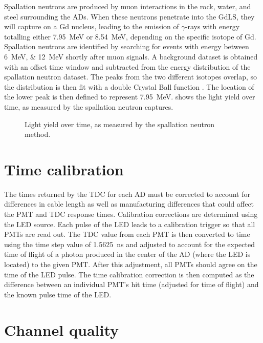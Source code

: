 Spallation neutrons are produced by muon interactions in the rock,
water, and steel surrounding the ADs.
When these neutrons penetrate into the GdLS,
they will capture on a Gd nucleus, leading to the emission of $\gamma$-rays
with energy totalling either \SI{7.95}{\MeV} or \SI{8.54}{\MeV},
depending on the specific isotope of Gd.
Spallation neutrons are identified by searching for events
with energy between \SIlist{6;12}{\MeV} shortly after muon signals.
A background dataset is obtained with an offset time window
and subtracted from the energy distribution of the spallation neutron dataset.
The peaks from the two different isotopes overlap,
so the distribution is then fit with a double Crystal Ball function \cite{cbfunction}.
The location of the lower peak is then defined to represent \SI{7.95}{\MeV}.
 shows the light yield over time,
as measured by the spallation neutron captures.

\begin{figure}
    \caption{Light yield over time, as measured by the spallation neutron method.}
    \label{fig:lightyield}
\end{figure}

\section{Time calibration}
\label{sec:time_calib}

The times returned by the TDC for each AD must be corrected
to account for differences in cable length as well as
manufacturing differences that could affect the PMT and TDC response times.
Calibration corrections are determined using the LED source.
Each pulse of the LED leads to a calibration trigger so that all PMTs are read out.
The TDC value from each PMT is then converted to time using the
time step value of \SI{1.5625}{\ns} and adjusted
to account for the expected time of flight
of a photon produced in the center of the AD (where the LED is located)
to the given PMT.
After this adjustment, all PMTs should agree on the time of the LED pulse.
The time calibration correction is then computed
as the difference between an individual PMT's hit time
(adjusted for time of flight)
and the known pulse time of the LED.

\section{Channel quality}
\label{sec:channel_quality}

